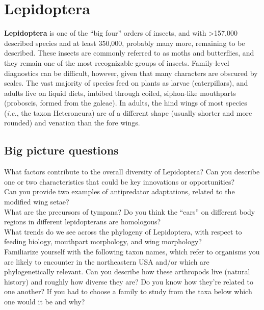 \documentclass[letterpaper, 11pt]{article}
\begin{document}
\section{Lepidoptera}

\noindent{}\textbf{Lepidoptera} is one of the ``big four'' orders of insects, and with \textgreater157,000 described species and at least 350,000, probably many more, remaining to be described. These insects are commonly referred to as moths and butterflies, and they remain one of the most recognizable groups of insects. Family-level diagnostics can be difficult, however, given that many characters are obscured by scales. The vast majority of species feed on plants as larvae (caterpillars), and adults live on liquid diets, imbibed through coiled, siphon-like mouthparts (proboscis, formed from the galeae). In adults, the hind wings of most species (\textit{i.e.}, the taxon Heteroneura) are of a different shape (usually shorter and more rounded) and venation than the fore wings.

\subsection*{Big picture questions}
\noindent{}What factors contribute to the overall diversity of Lepidoptera? Can you describe one or two characteristics that could be key innovations or opportunities? \\


\noindent{}Can you provide  two examples of antipredator adaptations, related to the modified wing setae? \\

\noindent{}What are the precursors of tympana? Do you think the ``ears'' on different body regions in different lepidopterans are homologous? \\ 

\noindent{}What trends do we see across the phylogeny of Lepidoptera, with respect to feeding biology, mouthpart morphology, and wing morphology? \\

\noindent{}Familiarize yourself with the following taxon names, which refer to organisms you are likely to encounter in the northeastern USA and/or which are phylogenetically relevant. Can you describe how these arthropods live (natural history) and roughly how diverse they are? Do you know how they're related to one another? If you had to choose a family to study from the taxa below which one would it be and why?
\end{document}
